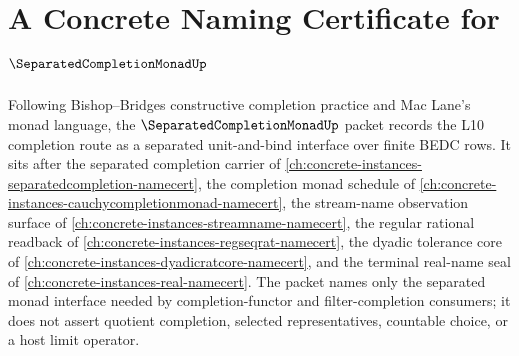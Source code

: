 \chapter{A Concrete Naming Certificate for $\SeparatedCompletionMonadUp$}
\label{ch:concrete-instances-separated-completion-monad-namecert}

Following Bishop--Bridges constructive completion practice and Mac Lane's monad language, the $\SeparatedCompletionMonadUp$ packet records the L10 completion route as a separated unit-and-bind interface over finite BEDC rows. It sits after the separated completion carrier of \autoref{ch:concrete-instances-separatedcompletion-namecert}, the completion monad schedule of \autoref{ch:concrete-instances-cauchycompletionmonad-namecert}, the stream-name observation surface of \autoref{ch:concrete-instances-streamname-namecert}, the regular rational readback of \autoref{ch:concrete-instances-regseqrat-namecert}, the dyadic tolerance core of \autoref{ch:concrete-instances-dyadicratcore-namecert}, and the terminal real-name seal of \autoref{ch:concrete-instances-real-namecert}. The packet names only the separated monad interface needed by completion-functor and filter-completion consumers; it does not assert quotient completion, selected representatives, countable choice, or a host limit operator.

